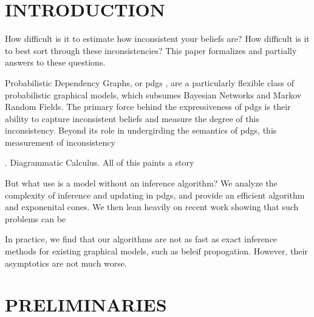 \documentclass[twoside]{article}
\begin{document}
% 




\section{INTRODUCTION}

How difficult is it to estimate how inconsistent your beliefs are?
How difficult is it to best sort through these inconsistencies? 
This paper formalizes and partially answers to these questions.

Probabilistic Dependency Graphs, or pdgs \parencite{pdg-aaai},
are a particularly flexible class of probabilistic graphical models, which subsumes Bayesian Networks and Markov Random Fields.
The primary force behind the expressiveness of pdgs is their ability to capture inconsistent beliefs and measure the degree of this inconsistency.
%
Beyond its role in undergirding the semantics of pdgs, 
this measurement of inconsistency  


 \parencite{one-true-loss}.
Diagrammatic Calculus.
All of this paints a story 

But what use is a model without an inference algorithm? 
We analyze the complexity of inference and updating in pdgs, and 
provide an efficient algorithm and exponenital cones.
We then lean heavily on recent work 
\parencite{dahl2022primal} showing that 
such problems can be 

In practice, we find that our algorithms are not as fast as exact inference methods for existing graphical models, such as beleif propogation.   
However, their asymptotics are not much worse.

\section{PRELIMINARIES}
\end{document}
